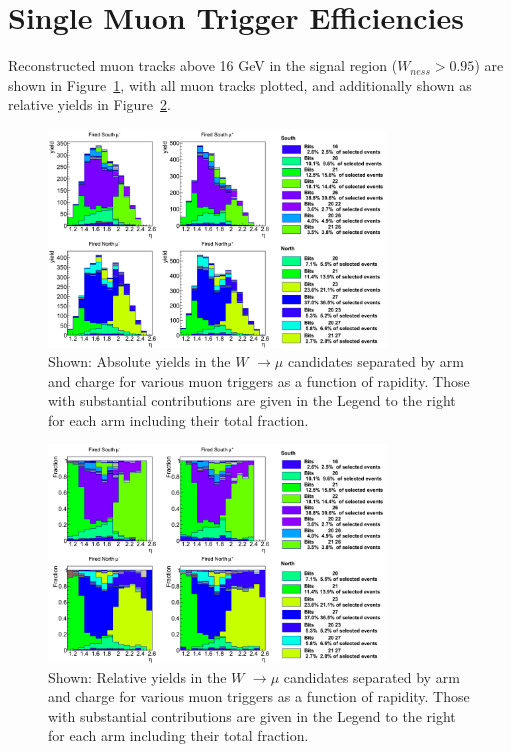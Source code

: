 \clearpage
\section{Single Muon Trigger Efficiencies}
Reconstructed muon tracks above 16 GeV in the signal region ($W_{ness} > 0.95$)
are shown in Figure~\ref{fig:triggerstack_all}, with all muon tracks plotted,
and additionally shown as relative yields in
Figure~\ref{fig:triggerrel_all}.

\begin{figure}[ht]
  \centering
  \includegraphics[width=0.8\textwidth]{./figures/triggerstack13_all.png}
  \caption{
    Shown: Absolute yields in the $W$ $\rightarrow \mu$ candidates separated by
    arm and charge for various muon triggers as a function of rapidity. Those
    with substantial contributions are given in the Legend to the right for each
    arm including their total fraction.
  }
  \label{fig:triggerstack_all} 
\end{figure}

\begin{figure}[ht]
  \centering
  \includegraphics[width=0.8\textwidth]{./figures/triggerrel13_all.png}
  \caption{
    Shown: Relative yields in the $W$ $\rightarrow \mu$ candidates separated by
    arm and charge for various muon triggers as a function of rapidity. Those
    with substantial contributions are given in the Legend to the right for each
    arm including their total fraction.
  }
  \label{fig:triggerrel_all} 
\end{figure}

